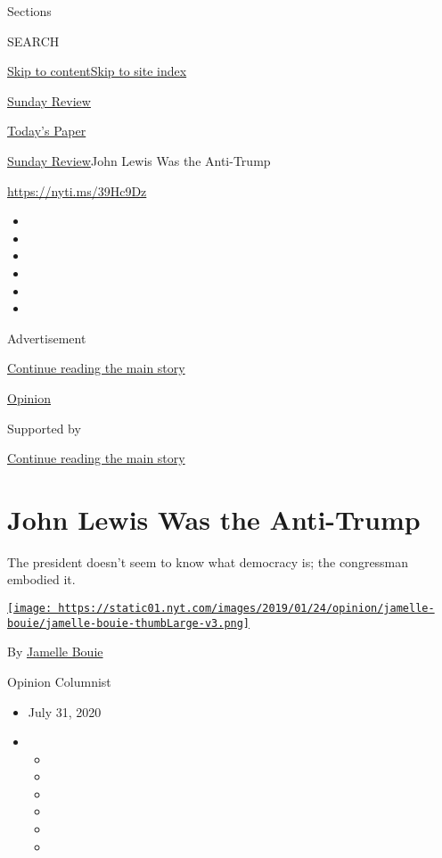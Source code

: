Sections

SEARCH

\protect\hyperlink{site-content}{Skip to
content}\protect\hyperlink{site-index}{Skip to site index}

\href{https://www.nytimes.com/section/opinion/sunday}{Sunday Review}

\href{https://myaccount.nytimes.com/auth/login?response_type=cookie\&client_id=vi}{}

\href{https://www.nytimes.com/section/todayspaper}{Today's Paper}

\href{/section/opinion/sunday}{Sunday Review}\textbar{}John Lewis Was
the Anti-Trump

\href{https://nyti.ms/39Hc9Dz}{https://nyti.ms/39Hc9Dz}

\begin{itemize}
\item
\item
\item
\item
\item
\item
\end{itemize}

Advertisement

\protect\hyperlink{after-top}{Continue reading the main story}

\href{/section/opinion}{Opinion}

Supported by

\protect\hyperlink{after-sponsor}{Continue reading the main story}

\hypertarget{john-lewis-was-the-anti-trump}{%
\section{John Lewis Was the
Anti-Trump}\label{john-lewis-was-the-anti-trump}}

The president doesn't seem to know what democracy is; the congressman
embodied it.

\href{https://www.nytimes.com/column/jamelle-bouie}{\texttt{[image: https://static01.nyt.com/images/2019/01/24/opinion/jamelle-bouie/jamelle-bouie-thumbLarge-v3.png]}}

By \href{https://www.nytimes.com/column/jamelle-bouie}{Jamelle Bouie}

Opinion Columnist

\begin{itemize}
\item
  July 31, 2020
\item
  \begin{itemize}
  \item
  \item
  \item
  \item
  \item
  \item
  \end{itemize}
\end{itemize}

